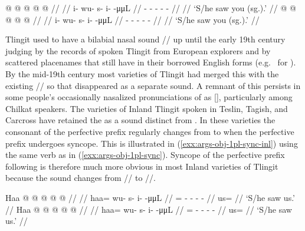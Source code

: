 \pex\label{exx:args-obj-1pl-sync-2sg}%
\a\label{ex:args-obj-1pl-sync-2sg-without}%
%
\ljudge{*}%
\begingl
	\gla	{} @ {} @ {} @ {} @ {} @ {} //
	\glp	\llap{[}\rlap{\ipa{ʔì.\gm{wù}.sì.ˈtʰìːn}]} {} {} {} {} {} //
	\glb	i- wu- s- i-  -μμL //
	\glc	{}- - - -  - //
	\gld	{} {} {} {} {} {} //
	\glft	‘S/he saw you (sg.).’
		//
\endgl
\a\label{ex:args-obj-1pl-sync-2sg-with}%
%
\begingl
	\gla	{} @ {} @ {} @ {} @ {} @ {} //
	\glp	\llap{[}\rlap{\ipa{ʔì\gm{w}.sì.ˈtʰìːn}]} {} {} {} {} {} //
	\glb	i- wu- s- i-  -μμL //
	\glc	{}- - - -  - //
	\gld	{} {} {} {} {} {} //
	\glft	‘S/he saw you (sg.).’
		//
\endgl
\xe

Tlingit used to have a bilabial nasal sound  // up until the early 19th century judging by the records of spoken Tlingit from European explorers and by scattered placenames that still have  in their borrowed English forms (e.g.\  for ). By the mid-19th century most varieties of Tlingit had merged this with the existing  // so that  disappeared as a separate sound. A remnant of this  persists in some people’s occasionally nasalized pronunciations of  as [], particularly among Chilkat speakers. The varieties of Inland Tlingit spoken in Teslin, Tagish, and Carcross have retained the  as a sound distinct from . In these varieties the consonant of the perfective prefix regularly changes from  to  when the perfective prefix undergoes syncope. This is illustrated in (\ref{exx:args-obj-1pl-sync-inl}) using the same verb as in (\ref{exx:args-obj-1pl-sync}). Syncope of the perfective prefix following  is therefore much more obvious in most Inland varieties of Tlingit because the sound changes from // to //.

\pex\label{exx:args-obj-1pl-sync-inl}%
\a\label{ex:args-obj-1pl-sync-inl-without}%
%
\begingl
	\gla	Haa @  @ {} @ {} @ {} @ {} //
	\glp	\llap{[}\rlap{\ipa{hàː.\gm{wù}.sì.ˈtʰìːn}]} {} {} {} {} {} //
	\glb	haa= wu- s- i-  -μμL //
	\glc	{}= - - -  - //
	\gld	us=  {} {} {} {} //
	\glft	‘S/he saw us.’
		//
\endgl
\a\label{ex:args-obj-1pl-sync-inl-with}%
%
\begingl
	\gla	Haa @  @ {} @ {} @ {} @ {} //
	\glp	\llap{[}\rlap{\ipa{hàː\gm{m}.sì.ˈtʰìːn}]} {} {} {} {} {} //
	\glb	haa= wu- s- i-  -μμL //
	\glc	{}= - - -  - //
	\gld	us=  {} {} {} {} //
	\glft	‘S/he saw us.’
		//
\endgl
\xe


